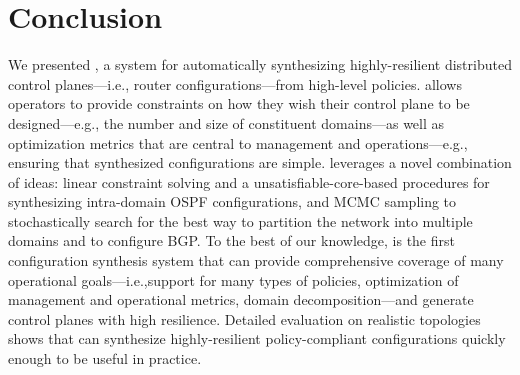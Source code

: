\section{Conclusion}

We presented \name, a system for automatically synthesizing 
highly-resilient
distributed control planes---i.e., router configurations---from
high-level policies. \name allows operators to provide constraints on
how they wish their control plane to be designed---e.g., the number and size
of constituent domains---as well as optimization metrics that are
central to management and operations---e.g., ensuring   that  synthesized configurations  are
simple. \name leverages a novel combination of ideas: linear constraint solving
and a unsatisfiable-core-based procedures for synthesizing
intra-domain OSPF configurations, and MCMC sampling to stochastically
search for the best way to partition the network into multiple domains
and to configure BGP. To the best of our knowledge, \name is the first
configuration synthesis system that can  provide comprehensive coverage of
many operational goals---i.e.,support for many types of policies,
optimization of management and operational metrics, domain
decomposition---and generate control planes with high resilience. 
Detailed evaluation on realistic topologies shows
that \name can synthesize highly-resilient policy-compliant configurations quickly enough to be
useful in practice.
